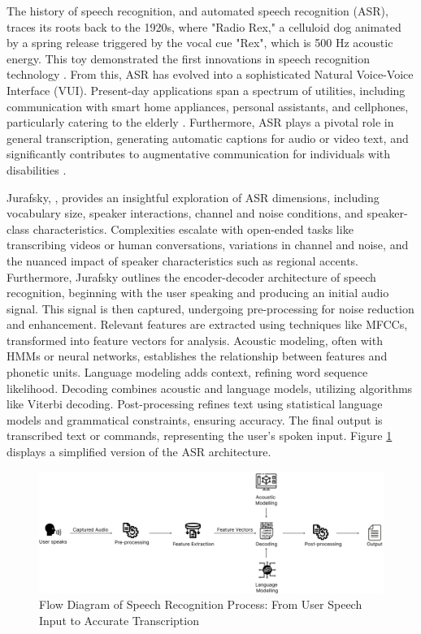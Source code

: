 \documentclass{l4proj}
\begin{document}
The history of speech recognition, and automated speech recognition (ASR), traces its roots back to the 1920s, where "Radio Rex," a celluloid dog animated by a spring release triggered by the vocal cue "Rex", which is 500 Hz acoustic energy. This toy demonstrated the first innovations in speech recognition technology \citep{david1962eyes}. From this, ASR has evolved into a sophisticated Natural Voice-Voice Interface (VUI). Present-day applications span a spectrum of utilities, including communication with smart home appliances, personal assistants, and cellphones, particularly catering to the elderly \citep{song2022investigation}. Furthermore, ASR plays a pivotal role in general transcription, generating automatic captions for audio or video text, and significantly contributes to augmentative communication for individuals with disabilities \citep{semary2024using}.

Jurafsky, \citep{jurafskyspeech}, provides an insightful exploration of ASR dimensions, including vocabulary size, speaker interactions, channel and noise conditions, and speaker-class characteristics. Complexities escalate with open-ended tasks like transcribing videos or human conversations, variations in channel and noise, and the nuanced impact of speaker characteristics such as regional accents. Furthermore, Jurafsky outlines the encoder-decoder architecture of speech recognition, beginning with the user speaking and producing an initial audio signal. This signal is then captured, undergoing pre-processing for noise reduction and enhancement. Relevant features are extracted using techniques like MFCCs, transformed into feature vectors for analysis. Acoustic modeling, often with HMMs or neural networks, establishes the relationship between features and phonetic units. Language modeling adds context, refining word sequence likelihood. Decoding combines acoustic and language models, utilizing algorithms like Viterbi decoding. Post-processing refines text using statistical language models and grammatical constraints, ensuring accuracy. The final output is transcribed text or commands, representing the user's spoken input. Figure \ref{fig:ASR} displays a simplified version of the ASR architecture. 

\begin{figure}
    \centering
    \includegraphics[width=1.0\linewidth]{dissertation/images/ASR.png}    
    \caption{Flow Diagram of Speech Recognition Process: From User Speech Input to Accurate Transcription}
    \label{fig:ASR} 
\end{figure} 
\end{document}
